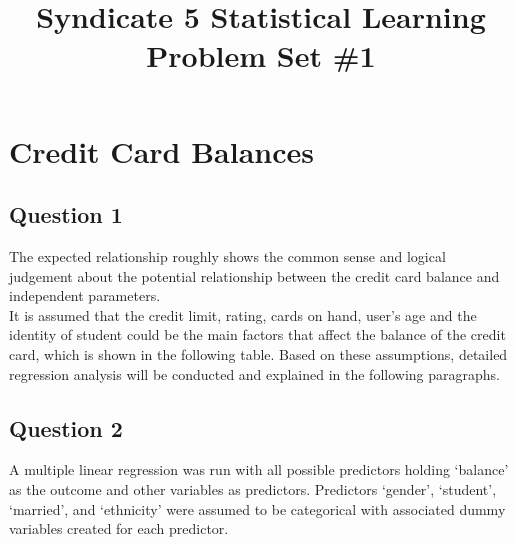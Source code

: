 \documentclass[11pt]{article}
\begin{document}
\title{Syndicate 5 Statistical Learning Problem Set \#1}
\maketitle
{}
{\setlength{\parindent}{0cm}


\section*{Credit Card Balances}
\subsection*{Question 1}
The expected relationship roughly shows the common sense and logical judgement about the potential relationship between the credit card balance and independent parameters.\\

It is assumed that the credit limit, rating, cards on hand, user’s age and the identity of student could be the main factors that affect the balance of the credit card, which is shown in the following table. Based on these assumptions, detailed regression analysis will be conducted and explained in the following paragraphs. 


\subsection*{Question 2}
A multiple linear regression was run with all possible predictors holding ‘balance’ as the outcome and other variables as predictors. Predictors ‘gender’, ‘student’, ‘married’, and ‘ethnicity’ were assumed to be categorical with associated dummy variables created for each predictor.\\ 

}
\end{document}
